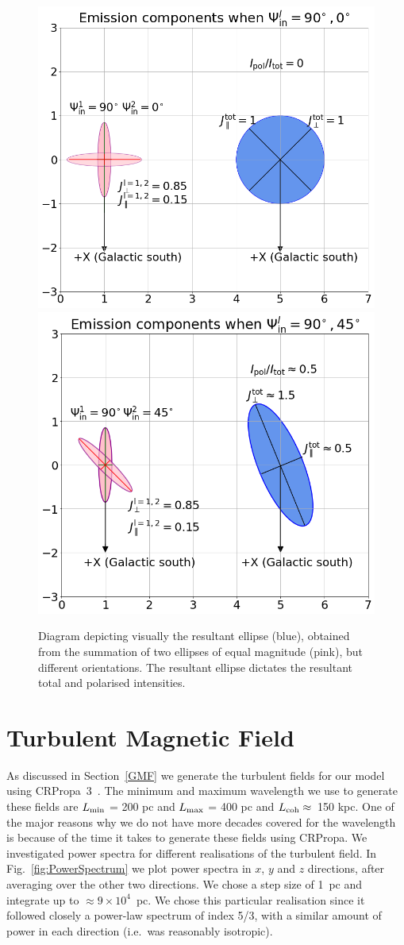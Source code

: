 \documentclass[usenatbib]{mnras}
\begin{document}
\begin{figure}
\centering
\includegraphics[width = 0.49\linewidth]{Images/Total_intensity_Ellipses_circles_emissions.png}
\label{fig_tot_intensity}
\includegraphics[width = 0.49\linewidth]{Images/Pol_intensity_Ellipses_circles_emissions.png}
\label{fig_pol_intensity}
\caption{Diagram depicting visually the resultant ellipse (blue), obtained from the summation of two ellipses of equal magnitude (pink), but different orientations. The resultant ellipse dictates the resultant total and polarised intensities.}
\label{fig_tot_pol_intensity}
\end{figure}


\section{Turbulent Magnetic Field}
\label{Appendix_B}
As discussed in Section~\ref{GMF} we generate the turbulent fields for our model using CRPropa~3~\citep{CRPropa3_2016}. The minimum and maximum wavelength we use to generate these fields are 
$L_{\rm min}$ = 200 pc and $L_{\rm max}$ = 400 pc and $L_{\rm coh} \approx $~150 kpc. One of the major reasons why we do not have more decades covered for the wavelength is because of the time it takes to generate these fields using CRPropa. 
We investigated power spectra for different realisations of the turbulent field. In Fig.~\ref{fig:PowerSpectrum} we plot power spectra in $x$, $y$ and $z$ directions, after averaging over the other two directions. We chose a step size of 1~pc and integrate up to $\approx 9\times10^4$~pc. We chose this particular realisation since it followed closely a power-law spectrum of index 5/3, with a similar amount of power in each direction (i.e.~was reasonably isotropic). 
\end{document}
